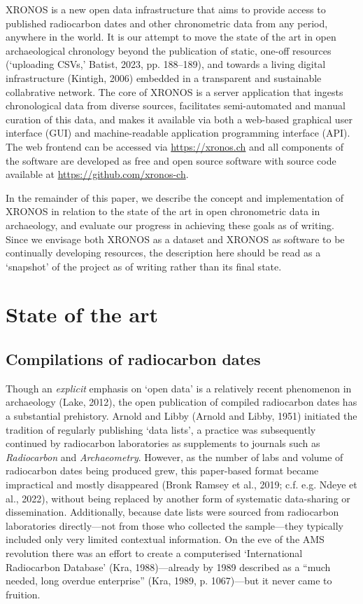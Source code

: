 \documentclass[
  number,
  doubleblind]{elsarticle}
\begin{document}
XRONOS is a new open data infrastructure that aims to provide access to
published radiocarbon dates and other chronometric data from any period,
anywhere in the world. It is our attempt to move the state of the art in
open archaeological chronology beyond the publication of static, one-off
resources (`uploading CSVs,' Batist, 2023, pp. 188--189), and towards a
living digital infrastructure (Kintigh, 2006) embedded in a transparent
and sustainable collabrative network. The core of XRONOS is a server
application that ingests chronological data from diverse sources,
facilitates semi-automated and manual curation of this data, and makes
it available via both a web-based graphical user interface (GUI) and
machine-readable application programming interface (API). The web
frontend can be accessed via \url{https://xronos.ch} and all components
of the software are developed as free and open source software with
source code available at \url{https://github.com/xronos-ch}.

In the remainder of this paper, we describe the concept and
implementation of XRONOS in relation to the state of the art in open
chronometric data in archaeology, and evaluate our progress in achieving
these goals as of writing. Since we envisage both XRONOS as a dataset
and XRONOS as software to be continually developing resources, the
description here should be read as a `snapshot' of the project as of
writing rather than its final state.

\section{State of the art}\label{state-of-the-art}

\subsection{Compilations of radiocarbon
dates}\label{sec-c14-compilation}

Though an \emph{explicit} emphasis on `open data' is a relatively recent
phenomenon in archaeology (Lake, 2012), the open publication of compiled
radiocarbon dates has a substantial prehistory. Arnold and Libby (Arnold
and Libby, 1951) initiated the tradition of regularly publishing `data
lists', a practice was subsequently continued by radiocarbon
laboratories as supplements to journals such as \emph{Radiocarbon} and
\emph{Archaeometry}. However, as the number of labs and volume of
radiocarbon dates being produced grew, this paper-based format became
impractical and mostly disappeared (Bronk Ramsey et al., 2019; c.f. e.g.
Ndeye et al., 2022), without being replaced by another form of
systematic data-sharing or dissemination. Additionally, because date
lists were sourced from radiocarbon laboratories directly---not from
those who collected the sample---they typically included only very
limited contextual information. On the eve of the AMS revolution there
was an effort to create a computerised `International Radiocarbon
Database' (Kra, 1988)---already by 1989 described as a ``much needed,
long overdue enterprise'' (Kra, 1989, p. 1067)---but it never came to
fruition.
\end{document}

